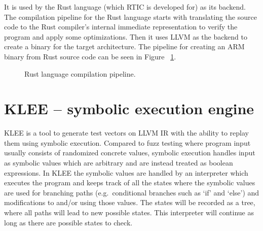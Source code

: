 It is used by the Rust language (which RTIC is developed for) as its backend.
The compilation pipeline for the Rust language starts with translating the
source code to the Rust compiler's internal immediate representation to
verify the program and apply some optimizations. Then it uses LLVM as the backend
to create a binary for the target architecture. The pipeline for creating an
ARM binary from Rust source code can be seen in Figure
~\ref{figure:rustcompilation}.
\begin{figure}[h]
    \centering
    \caption{Rust language compilation pipeline.}
    \label{figure:rustcompilation}
\end{figure}


\section{KLEE -- symbolic execution engine}
KLEE\cite{kleepaper} is a tool to generate test vectors on LLVM IR with the
ability to replay them using symbolic execution. Compared to fuzz testing
where program input usually consists of randomized concrete values, symbolic
execution handles input as symbolic values which are arbitrary and are instead
treated as boolean expressions. In KLEE the symbolic values are handled by an
interpreter which executes the program and keeps track of all the states where
the symbolic values are used for branching paths (e.g.\ conditional branches
such as `if' and `else') and modifications to and/or using those values. The
states will be recorded as a tree, where all paths will lead to new possible
states.  This interpreter will continue as long as there are possible states to
check.


